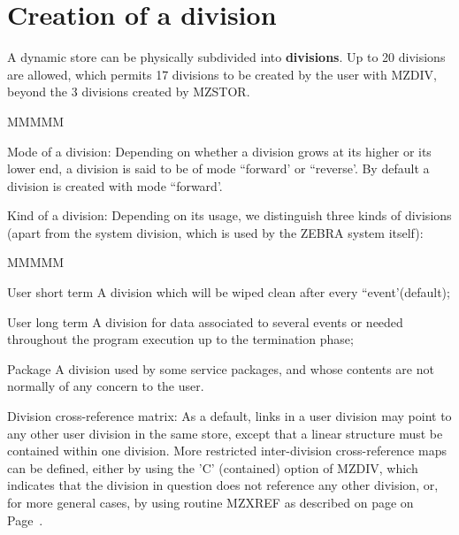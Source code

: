 \section{Creation of a division}
\par A dynamic store can be physically subdivided into {\bf divisions}.
Up to 20 divisions are allowed, which permits 17 divisions
to be created by the user with MZDIV, beyond the 3 divisions
created by MZSTOR.
\begin{DL}{MMMMM}
\item[Mode of a division:
]Depending on whether a division grows
at its higher or its lower end,
a division is said to be of mode ``forward' or ``reverse'.
By default a division is created with mode ``forward'.
\item[Kind of a division:
]Depending on its usage,
we distinguish three kinds of divisions (apart from the
system division, which is used by the ZEBRA system itself):
\begin{DL}{MMMMM}
\item[User short term
]A division which will be wiped clean after every
``event'(default);
\item[User long term
]A division for data associated to several events or needed
throughout the program execution up to the termination phase;
\item[Package
]A division used by some service
packages, and whose contents are not normally of any concern to the user.
\end{DL}
\item[Division cross-reference matrix:
]As a default, links in a user division
may point to any other user division in the same store,
except that a linear structure must be contained within one division.
More restricted inter-division cross-reference maps can be defined,
either by using the
'C' (contained) option of MZDIV, which indicates that the division
in question does not reference any other division, or, for more general
cases, by using routine MZXREF
as described on page on Page~\pageref{MZXREF FORM=PAGEONLY}.
\end{DL}
